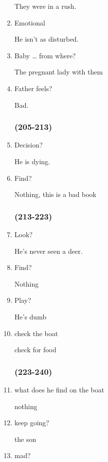 \begin{multicols}{3}
\begin{enumerate}
    They were in a rush.

    \item Emotional

    He isn’t as disturbed.

    \item Baby … from where?

    The pregnant lady with them

    \item Father feels?

    Bad.

    \subsubsection{(205-213)}

    \item Decision?

    He is dying.

    \item Find?

    Nothing, this is a bad book

    \subsubsection{(213-223)}

    \item Look?

    He’s never seen a deer.

    \item Find?

    Nothing

    \item Play?

    He’s dumb

    \item check the boat

    check for food

    \subsubsection{(223-240)}

    \item what does he find on the boat

    nothing

    \item keep going?

    the son

    \item mad?


\end{enumerate}
\end{multicols}
